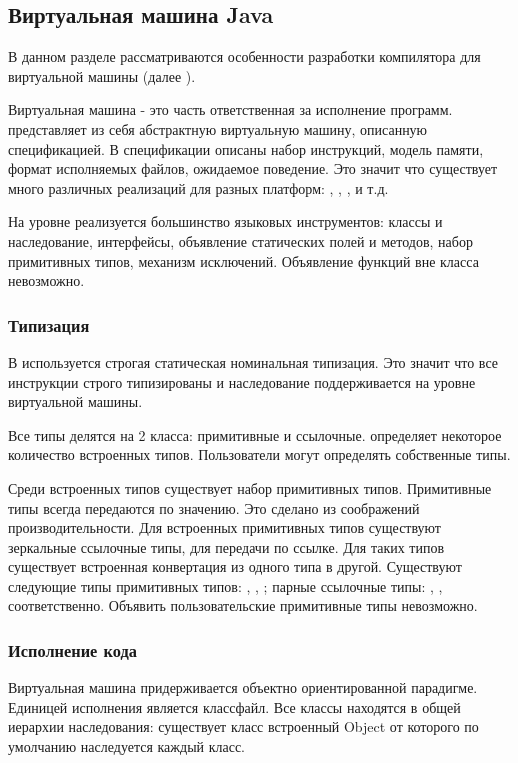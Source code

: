 \subsection{Виртуальная машина Java}
В данном разделе рассматриваются особенности разработки компилятора для виртуальной машины (далее ).

Виртуальная машина  - это часть  ответственная за исполнение программ.  представляет из себя абстрактную виртуальную машину, описанную спецификацией\cite{jvm:specification}. В спецификации описаны набор инструкций, модель памяти, формат исполняемых файлов, ожидаемое поведение. Это значит что существует много различных реализаций  для разных платформ: , , ,  и т.д.

На уровне  реализуется большинство языковых инструментов: классы и наследование, интерфейсы, объявление статических полей и методов, набор примитивных типов, механизм исключений. Объявление функций вне класса невозможно.

\subsubsection{Типизация}
В  используется строгая статическая номинальная типизация. Это значит что все инструкции строго типизированы и наследование поддерживается на уровне виртуальной машины.

Все типы делятся на 2 класса: примитивные и ссылочные.  определяет некоторое количество встроенных типов. Пользователи могут определять собственные типы.

Среди встроенных типов существует набор примитивных типов. Примитивные типы всегда передаются по значению. Это сделано из соображений производительности. Для встроенных примитивных типов существуют зеркальные ссылочные типы, для передачи по ссылке. Для таких типов существует встроенная конвертация из одного типа в другой. Существуют следующие типы примитивных типов: , , ; парные ссылочные типы: , ,  соответственно. Объявить пользовательские примитивные типы невозможно.

\subsubsection{Исполнение кода}
Виртуальная машина  придерживается объектно ориентированной парадигме. Единицей исполнения является классфайл. Все классы находятся в общей иерархии наследования: существует класс встроенный Object от которого по умолчанию наследуется каждый класс.

